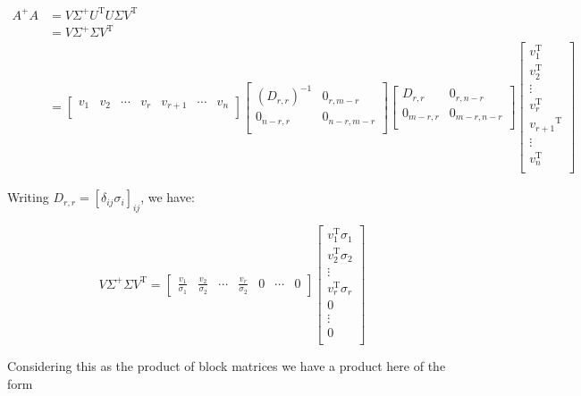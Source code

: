 \documentclass{article}      %
\newcommand{\T}[0]{\text{T}}
\begin{document}
\begin{align*}
A^{+} A 
&= V \Sigma^{+} U^\T U \Sigma V^\T \\
&= V \Sigma^{+} \Sigma V^\T \\
&=
\begin{bmatrix}
v_1 & v_2 & \cdots & v_r & v_{r+1} & \cdots & v_n \\
\end{bmatrix}
\begin{bmatrix}
(D_{r,r})^{-1} & 0_{r,m-r} \\
0_{n-r,r} & 0_{n-r,m-r} \\
\end{bmatrix}
\begin{bmatrix}
D_{r,r} & 0_{r,n-r} \\
0_{m-r,r} & 0_{m-r,n-r} \\
\end{bmatrix}
\begin{bmatrix}
v_1^\T \\ v_2^\T \\ \vdots \\ v_r^\T \\ {v_{r+1}}^\T \\ \vdots \\ v_n^\T \\
\end{bmatrix}
\end{align*}

Writing $D_{r,r} = [\delta_{ij}\sigma_i]_{ij}$, we have:

\begin{equation}\label{eqn:VIrVt}
V \Sigma^{+} \Sigma V^\T 
=
\begin{bmatrix}
\frac{v_1}{\sigma_1} & \frac{v_2}{\sigma_2} & \cdots & \frac{v_r}{\sigma_2} & 0 & \cdots & 0 
\end{bmatrix}
\begin{bmatrix}
v_1^\T \sigma_1 \\ v_2^\T \sigma_2 \\ \vdots \\ v_r^\T \sigma_r \\ 0 \\ \vdots \\ 0 \\
\end{bmatrix}
\end{equation}

Considering this as the product of block matrices we have a product here of the form
\end{document}

